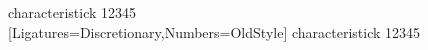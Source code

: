 \documentclass{standalone}
\begin{document}
\fontsize{14}{16}\selectfont
\begin{minipage}{3in}
characteristick 12345\\
[Ligatures=Discretionary,Numbers=OldStyle]
characteristick 12345
\end{minipage}
\end{document}
